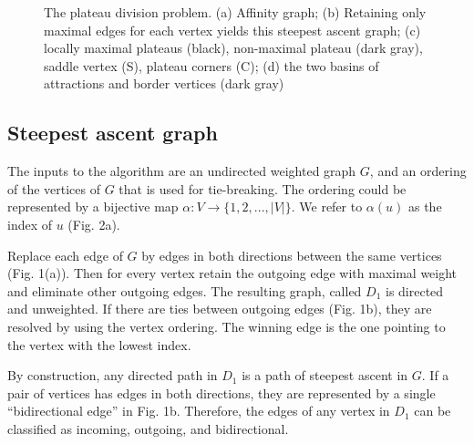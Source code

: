 \documentclass{article}
\begin{document}
\begin{figure}

  \protect\caption{The plateau division problem. (a) Affinity graph;
    (b) Retaining only maximal edges for each vertex yields this
    steepest ascent graph; (c) locally maximal plateaus (black),
    non-maximal plateau (dark gray), saddle vertex (S), plateau
    corners (C); (d) the two basins of attractions and border vertices
    (dark gray)}
\end{figure}

\subsection{Steepest ascent graph}
The inputs to the algorithm are an undirected weighted graph $G$, and
an ordering of the vertices of $G$ that is used for tie-breaking. The
ordering could be represented by a bijective map
$\alpha:V\to\{1,2,...,|V|\}$. We refer to $\alpha(u)$ as the index of
$u$ (Fig. 2a).

Replace each edge of $G$ by edges in both directions between the same
vertices (Fig. 1(a)).  Then for every vertex retain the outgoing edge
with maximal weight and eliminate other outgoing edges.  The resulting
graph, called $D_1$ is directed and unweighted.  If there are ties
between outgoing edges (Fig. 1b), they are resolved by using the
vertex ordering.  The winning edge is the one pointing to the vertex
with the lowest index.

By construction, any directed path in $D_1$ is a path of steepest
ascent in $G$.  If a pair of vertices has edges in both directions,
they are represented by a single ``bidirectional edge'' in Fig. 1b.
Therefore, the edges of any vertex in $D_1$ can be classified as
incoming, outgoing, and bidirectional.
\end{document}
